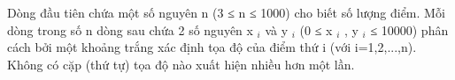 Dòng đầu tiên chứa một số nguyên n (3 ≤ n ≤ 1000) cho biết số lượng điểm. Mỗi dòng trong số n dòng sau chứa 2 số nguyên x   $_    i   $   và y   $_    i   $   (0 ≤ x   $_    i   $   , y   $_    i   $   ≤ 10000) phân cách bởi một khoảng trắng xác định tọa độ của điểm thứ i (với i=1,2,...,n). Không có cặp (thứ tự) tọa độ nào xuất hiện nhiều hơn một lần.